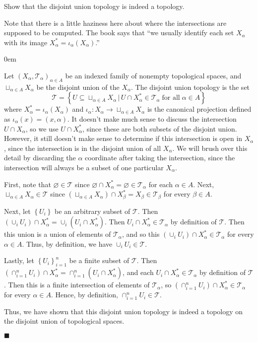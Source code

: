 \documentclass[12pt]{article}
\renewcommand{\qed}{\hfill$\blacksquare$}
\renewenvironment{proof}{\begin{addmargin}[1em]{0em}\begin{newproof}}{\end{newproof}\end{addmargin}\qed}
\newenvironment{exercise}[2][Exercise]{\begin{trivlist}
\item[\hskip \labelsep {\bfseries #1}\hskip \labelsep {\bfseries #2.}]}{\end{trivlist}}
\begin{document}
\begin{exercise}{3.40}
Show that the disjoint union topology is indeed a topology.
\end{exercise}
{\color{red}Note that there is a little haziness here about where the intersections are supposed to be computed. The book says that ``we usually identify each set $X_{\alpha}$ with its image $X_{\alpha}^* = \iota_{\alpha}\left(X_{\alpha}\right)$.''}\\
\begin{proof}
Let $\left(X_{\alpha}, \mathcal{T}_{\alpha}\right)_{\alpha \in A}$ be an indexed family of nonempty topological spaces, and $\sqcup_{\alpha \in A} X_{\alpha}$ be the disjoint union of the $X_{\alpha}$. The disjoint union topology is the set $$\mathcal{T}= \left\{ U \subseteq \sqcup_{\alpha \in A} X_{\alpha} \, | \, U\cap X_{\alpha}^* \in \mathcal{T}_{\alpha} \; \text{for all} \; \alpha \in A\right\}$$ where $X_{\alpha}^* = \iota_{\alpha}\left(X_{\alpha}\right)$ and $\iota_{\alpha}:X_{\alpha}\rightarrow \sqcup_{\alpha \in A} X_{\alpha}$ is the canonical projection defined as $\iota_{\alpha}\left(x\right) = \left(x,\alpha\right)$. {\color{red} It doesn't make much sense to discuss the intersection $U\cap X_{\alpha}$, so we use $U\cap X_{\alpha}^*$, since these are both subsets of the disjoint union. However, it still doesn't make sense to determine if this intersection is open in $X_{\alpha}$, since the intersection is in the disjoint union of all $X_{\alpha}$. We will brush over this detail by discarding the $\alpha$ coordinate after taking the intersection, since the intersection will always be a subset of one particular $X_{\alpha}$.}

First, note that $\varnothing \in \mathcal{T}$ since $\varnothing \cap X_{\alpha}^* = \varnothing \in \mathcal{T}_{\alpha}$ for each $\alpha \in A$. Next, $\sqcup_{\alpha \in A}X_{\alpha} \in \mathcal{T}$ since $\left(\sqcup_{\alpha \in A} X_{\alpha} \right) \cap  X_{\beta}^* = X_{\beta} \in \mathcal{T}_{\beta} $ for every $\beta \in A$.

Next, let $\left\{U_i\right\}$ be an arbitrary subset of $\mathcal{T}$. Then $\left(\cup_i U_i\right)\cap X^*_{\alpha} = \cup_i \left(U_i \cap X^*_\alpha \right) $. Then $U_i \cap X_{\alpha}^* \in \mathcal{T}_{\alpha}$ by definition of $\mathcal{T}$. Then this union is a union of elements of $\mathcal{T}_{\alpha}$, and so this $\left(\cup_i U_i\right)\cap X_{\alpha}^* \in \mathcal{T}_{\alpha}$ for every $\alpha \in A$. Thus, by definition, we have $\cup_i U_i \in \mathcal{T}$. 

Lastly, let $\left\{U_i\right\}_{i=1}^n$ be a finite subset of $\mathcal{T}$. Then $\left(\cap_{i=1}^n U_i\right)\cap X_{\alpha}^* = \cap_{i=1}^n \left(U_i \cap X_{\alpha}^*\right)$, and each $U_i \cap X_{\alpha}^* \in \mathcal{T}_{\alpha}$ by definition of $\mathcal{T}$. Then this is a finite intersection of elements of $\mathcal{T}_{\alpha}$, so $\left(\cap_{i=1}^n U_i\right)\cap X_{\alpha}^* \in \mathcal{T}_{\alpha}$ for every $\alpha \in A$. Hence, by definition, $\cap_{i=1}^n U_i \in \mathcal{T}$. 

Thus, we have shown that this disjoint union topology is indeed a topology on the disjoint union of topological spaces.
\end{proof}
\end{document}
